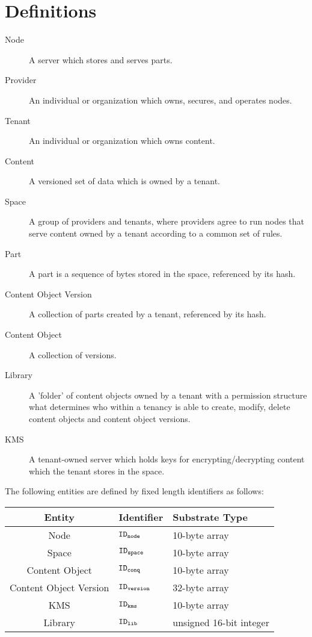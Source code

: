 \section{Definitions}
\begin{description}
  \item[Node] A server which stores and serves parts.
  \item[Provider] An individual or organization which owns, secures, and operates nodes.
  \item[Tenant] An individual or organization which owns content.
  \item[Content] A versioned set of data which is owned by a tenant.
  \item[Space] A group of providers and tenants, where providers agree to run nodes that serve content owned by a tenant according to a common set of rules.
  \item[Part] A part is a sequence of bytes stored in the space, referenced by its hash. 
  \item[Content Object Version] A collection of parts created by a tenant, referenced by its hash.
  \item[Content Object] A collection of versions.
  \item[Library] A 'folder' of content objects owned by a tenant with a permission structure what determines who within a tenancy is able to create, modify, delete content objects and content object versions.
  \item[KMS] A tenant-owned server which holds keys for encrypting/decrypting content which the tenant stores in the space.
\end{description}

The following entities are defined by fixed length identifiers as follows:
\begin{center}
  \begin{tabular}{| c | l | l |}
    \hline
    Entity & Identifier & Substrate Type \\
    \hline 
    Node & $\mathtt{ID_{node}}$ & 10-byte array \\ %
    Space & $\mathtt{ID_{space}}$ & 10-byte array \\
    Content Object & $\mathtt{ID_{conq}}$ & 10-byte array \\
    Content Object Version & $\mathtt{ID_{version}}$ & 32-byte array \\
    KMS & $\mathtt{ID_{kms}}$ & 10-byte array \\
    Library & $\mathtt{ID_{lib}}$ & unsigned 16-bit integer \\
    \hline 
  \end{tabular}
\end{center}
